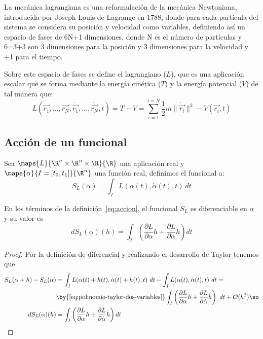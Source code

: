La mecánica lagrangiana es una reformulación de la mecánica Newtoniana, introducida por Joseph-Louis de Lagrange en 1788, donde para cada partícula del sistema se considera su posición y velocidad como variables, definiendo así un espacio de fases de 6N+1 dimensiones, donde N es el número de partículas y 6=3+3 son 3 dimensiones para la posición y 3 dimensiones para la velocidad y +1 para el tiempo.

Sobre este espacio de fases se define el lagrangiano ($L$), que es una aplicación escalar que se forma mediante la energía cinética ($T$) y la energía potencial ($V$) de tal manera que:
\begin{equation}
	\label{eq:lagrangiano_clasico}
	L(\vec{r_1},\dots,\vec{r_N},\dot{\vec{r_1}},\dots,\dot{\vec{r_N}},t)=T-V=\sum\limits_{i=1}^{i=N} \frac{1}{2}m\|\dot{\vec{r_i}}\|^2-V(\vec{r_i},t)
\end{equation}

\subsection{Acción de un funcional}
	Sea $\maps{L}{\R^n\times\R^n\times\R}{\R}$ una aplicación real y $\maps{\alpha}{I=[t_0, t_1]}{\R^n}$ una función real, definimos el funcional  a:
	\begin{equation}
		\label{eq:accion}
		S_L(\alpha) = \int_{I}L(\alpha(t), \dot{\alpha}(t), t)\ dt
	\end{equation}

\begin{proposition}
	En los términos de la definición~\eqref{eq:accion}, el funcional $S_L$ es diferenciable en $\alpha$ y su valor es
	\begin{equation}
		\label{eq:accion_diferencial}
		dS_L(\alpha)(h)=\int_{I}\left( \frac{\partial L}{\partial\alpha}h+\frac{\partial L}{\partial\dot{\alpha}}\dot{h}\right) dt
	\end{equation}
\end{proposition}
\begin{proof}
	Por la definición de diferencial y realizando el desarrollo de Taylor tenemos que
	\begin{equation*}
		\begin{split}
			S_L(\alpha + h) -  S_L(\alpha)& = \int_{I}L(\alpha(t)+h(t), \dot{\alpha}(t)+\dot{h}(t), t)\ dt - \int_{I}L(\alpha(t), \dot{\alpha}(t), t)\ dt =\\
			&\by{\ref{eq:polinomio-taylor-dos-variables}}\int_{I}\left( \frac{\partial L}{\partial\alpha}h+\frac{\partial L}{\partial\dot{\alpha}}\dot{h}\right)\ dt+\mathcal{O}(h^2)\so\\
			dS_L(\alpha)(h) &=\int_{I}\left( \frac{\partial L}{\partial\alpha}h+\frac{\partial L}{\partial\dot{\alpha}}\dot{h}\right) dt
		\end{split}
	\end{equation*}
\end{proof}


